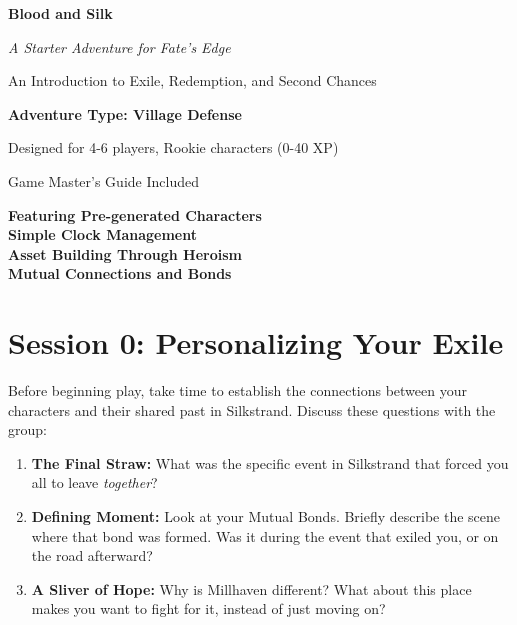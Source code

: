 \documentclass[11pt]{article}
\begin{document}
\begin{titlepage}
\centering
\vspace*{2cm}

{\Huge\bfseries\color{headercolor} Blood and Silk}

\vspace{0.5cm}

{\Large\itshape A Starter Adventure for Fate's Edge}

\vspace{1cm}

{\large An Introduction to Exile, Redemption, and Second Chances}

\vspace{2cm}

{\Large\bfseries Adventure Type: Village Defense}

\vspace{1cm}

{\large Designed for 4-6 players, Rookie characters (0-40 XP)}

\vspace{1cm}

{\large Game Master's Guide Included}

\vfill

{\large 
\textbf{Featuring Pre-generated Characters} \\
\textbf{Simple Clock Management} \\
\textbf{Asset Building Through Heroism} \\
\textbf{Mutual Connections and Bonds}
}

\end{titlepage}

\newpage

\tableofcontents

\newpage

\section{Session 0: Personalizing Your Exile}

Before beginning play, take time to establish the connections between your characters and their shared past in Silkstrand. Discuss these questions with the group:

\begin{enumerate}
\item \textbf{The Final Straw:} What was the specific event in Silkstrand that forced you all to leave \textit{together}?
\item \textbf{Defining Moment:} Look at your Mutual Bonds. Briefly describe the scene where that bond was formed. Was it during the event that exiled you, or on the road afterward?
\item \textbf{A Sliver of Hope:} Why is Millhaven different? What about this place makes you want to fight for it, instead of just moving on?
\end{enumerate}
\end{document}
